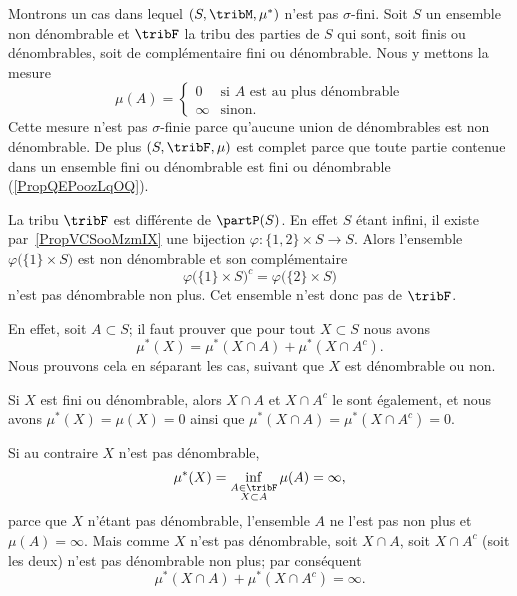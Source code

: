 \begin{example} \label{ExOIXoosScTC}
	Montrons un cas dans lequel \( (S,\tribM,\mu^*)\) n'est pas \( \sigma\)-fini. Soit \( S\) un ensemble non dénombrable et \( \tribF\) la tribu des parties de \( S\) qui sont, soit finis ou dénombrables, soit de complémentaire fini ou dénombrable. Nous y mettons la mesure
	\begin{equation}
		\mu(A)=\begin{cases}
			0      & \text{si } A  \text{ est au plus dénombrable} \\
			\infty & \text{sinon}.
		\end{cases}
	\end{equation}
	Cette mesure n'est pas \( \sigma\)-finie parce qu'aucune union de dénombrables est non dénombrable. De plus \( (S,\tribF,\mu)\) est complet parce que toute partie contenue dans un ensemble fini ou dénombrable est fini ou dénombrable (\ref{PropQEPoozLqOQ}).

	\begin{subproof}
		La tribu \( \tribF\) est différente de \( \partP(S)\). En effet \( S\) étant infini, il existe par~\ref{PropVCSooMzmIX} une bijection \( \varphi\colon \{ 1,2 \}\times S\to S\). Alors l'ensemble \( \varphi\big( \{ 1 \}\times S \big)\) est non dénombrable et son complémentaire
		\begin{equation}
			\varphi\big( \{ 1 \}\times S \big)^c=\varphi\big( \{ 2 \}\times S \big)
		\end{equation}
		n'est pas dénombrable non plus. Cet ensemble n'est donc pas de \( \tribF\).

		En effet, soit \( A\subset S\); il faut prouver que pour tout \( X\subset S\) nous avons
		\begin{equation}
			\mu^*(X)=\mu^*(X\cap A)+\mu^*(X\cap A^c).
		\end{equation}
		Nous prouvons cela en séparant les cas, suivant que \( X\) est dénombrable ou non.

		Si \( X\) est fini ou dénombrable, alors \( X\cap A\) et \( X\cap A^c\) le sont également, et nous avons \( \mu^*(X)=\mu(X)=0\) ainsi que \( \mu^*(X\cap A)=\mu^*(X\cap A^c)=0\).

		Si au contraire \( X\) n'est pas dénombrable,
		\begin{equation}
			\mu^*(X)=\inf_{\substack{A\in\tribF\\X\subset A}}\mu(A)=\infty,
		\end{equation}
		parce que \( X\) n'étant pas dénombrable, l'ensemble \( A\) ne l'est pas non plus et \( \mu(A)=\infty\). Mais comme \( X\) n'est pas dénombrable, soit \( X\cap A\), soit \( X\cap A^c\) (soit les deux) n'est pas dénombrable non plus; par conséquent
		\begin{equation}
			\mu^*(X\cap A)+\mu^*(X\cap A^c)=\infty.
		\end{equation}
	\end{subproof}


\end{example}

